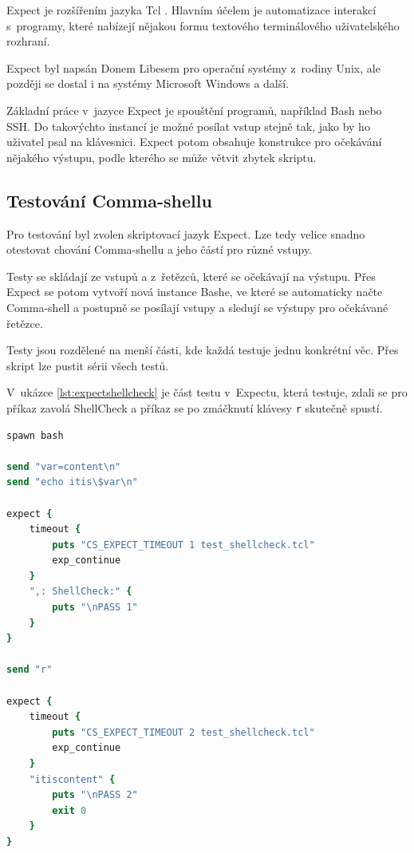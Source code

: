 \documentclass[thesis=M,czech]{FITthesis}[2012/06/26]
\begin{document}
Expect \cite{expect} je rozšířením jazyka Tcl \cite{tcl}. Hlavním účelem je automatizace interakcí s~programy, které nabízejí nějakou formu textového terminálového uživatelského rozhraní.

Expect byl napsán Donem Libesem pro operační systémy z~rodiny Unix, ale později se dostal i na systémy Microsoft Windows a další.

Základní práce v~jazyce Expect je spouštění programů, například Bash nebo SSH. Do takovýchto instancí je možné posílat vstup stejně tak, jako by ho uživatel psal na klávesnici. Expect potom obsahuje konstrukce pro očekávání nějakého výstupu, podle kterého se může větvit zbytek skriptu.



\subsection{Testování Comma-shellu}

Pro testování byl zvolen skriptovací jazyk Expect. Lze tedy velice snadno otestovat chování Comma-shellu a jeho částí pro různé vstupy.

Testy se skládají ze vstupů a z~řetězců, které se očekávají na výstupu. Přes Expect se potom vytvoří nová instance Bashe, ve které se automaticky načte Comma-shell a postupně se posílají vstupy a sledují se výstupy pro očekávané řetězce.

Testy jsou rozdělené na menší části, kde každá testuje jednu konkrétní věc. Přes skript lze pustit sérii všech testů.

V~ukázce \ref{lst:expectshellcheck} je část testu v~Expectu, která testuje, zdali se pro příkaz zavolá ShellCheck a příkaz se po zmáčknutí klávesy \texttt{r} skutečně spustí.


\noindent
\begin{minipage}{\linewidth}
\begin{lstlisting}[language=tcl, caption={Expect test}, label={lst:expectshellcheck}]
spawn bash

send "var=content\n"
send "echo itis\$var\n"

expect {
	timeout {
		puts "CS_EXPECT_TIMEOUT 1 test_shellcheck.tcl"
		exp_continue
	}
	",: ShellCheck:" {
		puts "\nPASS 1"
	}
}

send "r"

expect {
	timeout {
		puts "CS_EXPECT_TIMEOUT 2 test_shellcheck.tcl"
		exp_continue
	}
	"itiscontent" {
		puts "\nPASS 2"
		exit 0
	}
}
\end{lstlisting}
\end{minipage}
\end{document}
